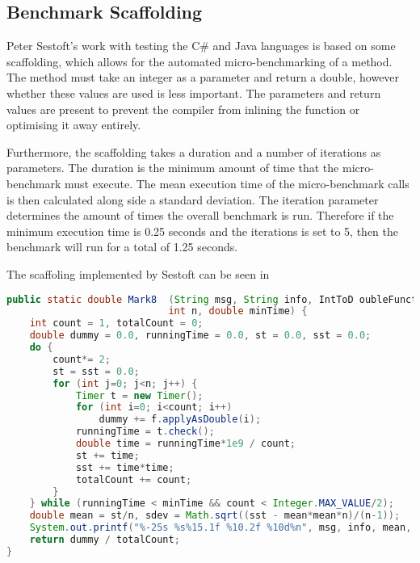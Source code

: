 \subsection{Benchmark Scaffolding} \label{sec:sestoft-scaffolding}
Peter Sestoft's  work with testing the C\# and Java languages is based on some scaffolding, which allows for the automated micro-benchmarking of a method. The method must take an integer as a parameter and return a double, however whether these values are used is less important. The parameters and return values are present to prevent the compiler from inlining the function or optimising it away entirely.

Furthermore, the scaffolding takes a duration and a number of iterations as parameters. The duration is the minimum amount of time that the micro-benchmark must execute. The mean execution time of the micro-benchmark calls is then calculated along side a standard deviation. The iteration parameter determines the amount of times the overall benchmark is run. Therefore if the minimum execution time is 0.25 seconds and the iterations is set to 5, then the benchmark will run for a total of 1.25 seconds.

The scaffoling implemented by Sestoft can be seen in 
\begin{lstlisting}[language=Java, style=java-highlight, caption={Sestoft's Scaffolding \cite{sestoft2013microbenchmarks}}, label=lst:sestoft]
public static double Mark8  (String msg, String info, IntToD oubleFunction f,
                            int n, double minTime) {
    int count = 1, totalCount = 0;
    double dummy = 0.0, runningTime = 0.0, st = 0.0, sst = 0.0;
    do {
        count*= 2;
        st = sst = 0.0;
        for (int j=0; j<n; j++) {
            Timer t = new Timer();
            for (int i=0; i<count; i++)
                dummy += f.applyAsDouble(i);
            runningTime = t.check();
            double time = runningTime*1e9 / count;
            st += time;
            sst += time*time;
            totalCount += count;
        }
    } while (runningTime < minTime && count < Integer.MAX_VALUE/2);
    double mean = st/n, sdev = Math.sqrt((sst - mean*mean*n)/(n-1));
    System.out.printf("%-25s %s%15.1f %10.2f %10d%n", msg, info, mean, sdev, count);
    return dummy / totalCount;
}
\end{lstlisting}